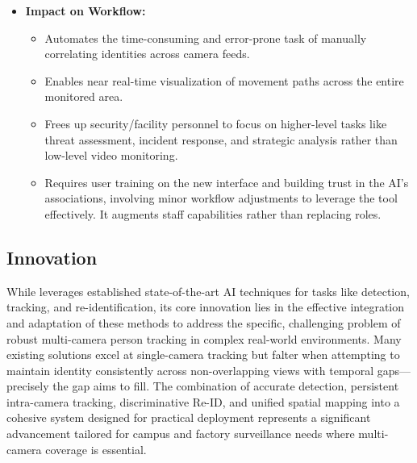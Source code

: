\begin{itemize}
    \item \textbf{Impact on Workflow:}
        \begin{itemize}
            \item Automates the time-consuming and error-prone task of manually correlating identities across camera feeds.
            \item Enables near real-time visualization of movement paths across the entire monitored area.
            \item Frees up security/facility personnel to focus on higher-level tasks like threat assessment, incident response, and strategic analysis rather than low-level video monitoring.
            \item Requires user training on the new interface and building trust in the AI's associations, involving minor workflow adjustments to leverage the tool effectively. It augments staff capabilities rather than replacing roles.
        \end{itemize}
\end{itemize}

\subsection{Innovation}
\label{subsection:innovation} %
While \usevar{\srsTitle} leverages established state-of-the-art AI techniques for tasks like detection, tracking, and re-identification, its core innovation lies in the effective integration and adaptation of these methods to address the specific, challenging problem of robust multi-camera person tracking in complex real-world environments. Many existing solutions excel at single-camera tracking but falter when attempting to maintain identity consistently across non-overlapping views with temporal gaps—precisely the gap \usevar{\srsTitle} aims to fill. The combination of accurate detection, persistent intra-camera tracking, discriminative Re-ID, and unified spatial mapping into a cohesive system designed for practical deployment represents a significant advancement tailored for campus and factory surveillance needs where multi-camera coverage is essential.

